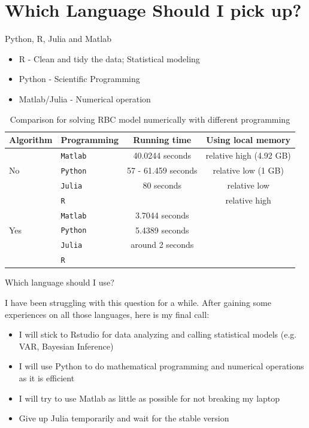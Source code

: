 \documentclass[handout]{beamer} %
\begin{document}
\section{Which Language Should I pick up?}

\begin{frame}{Python, R, Julia and Matlab}
	\begin{itemize}
		\item R - Clean and tidy the data; Statistical modeling
		\item Python - Scientific Programming
		\item Matlab/Julia - Numerical operation
	\end{itemize}
\begin{table}
	\centering
	\begin{tabular}{llcc}
	\toprule
	Algorithm	& Programming & Running time & Using local memory \\
	\hline
		&\texttt{Matlab} & 40.0244 seconds & relative high (4.92 GB)\\
		No &\texttt{Python} & 57 - 61.459 seconds & relative low (1 GB)\\
		&\texttt{Julia} & 80 seconds & relative low \\
		& \texttt{R} & & relative high\\
		\hline
		& \texttt{Matlab} & 3.7044 seconds & \\
	Yes & \texttt{Python} & 5.4389 seconds & \\
	    & \texttt{Julia} & around 2 seconds & \\
	    & \texttt{R} & \\
	    \hline
	    \hline
	\end{tabular}
	\caption{Comparison for solving RBC model numerically with different programming}
\end{table}
\end{frame}

\begin{frame}{Which language should I use?}

	I have been struggling with this question for a while. After gaining some experiences on all those languages, here is my final call:
	\begin{itemize}
	\setlength\itemsep{1em}
		\item I will stick to Rstudio for data analyzing and calling statistical models (e.g. VAR, Bayesian Inference)
		\item I will use Python to do mathematical programming and numerical operations as it is efficient
		\item I will try to use Matlab as little as possible for not breaking my laptop
		\item Give up Julia temporarily and wait for the stable version
	\end{itemize}
\end{frame}
\end{document}
